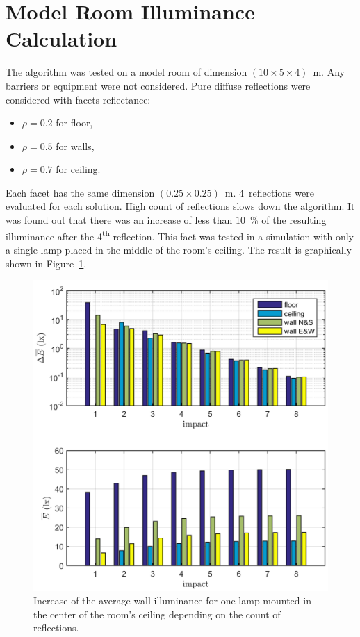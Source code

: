 \section{Model Room Illuminance Calculation}
The algorithm was tested on a model room of dimension $\left(10 \times 5 \times 4\right)$~m. Any barriers or equipment were not considered. Pure diffuse reflections were considered with facets reflectance:
\begin{itemize}
	\item $\rho = 0.2$ for floor,
	\item $\rho = 0.5$ for walls,
	\item $\rho = 0.7$ for ceiling.
\end{itemize}
Each facet has the same dimension $\left(0.25 \times 0.25\right)$~m. $4$~reflections were evaluated for each solution. High count of reflections slows down the algorithm. It was found out that there was an increase of less than $10$~\% of the resulting illuminance after the 4\textsuperscript{th} reflection. This fact was tested in a simulation with only a single lamp placed in the middle of the room's ceiling. The result is graphically shown in Figure~\ref{fig:reflDif}.

\begin{figure}[htb]
  \centering
  \includegraphics[width=\columnwidth]{reflDif}
  \caption{Increase of the average wall illuminance for one lamp mounted in the center of the room's ceiling depending on the count of reflections.}
  \label{fig:reflDif}
\end{figure}

